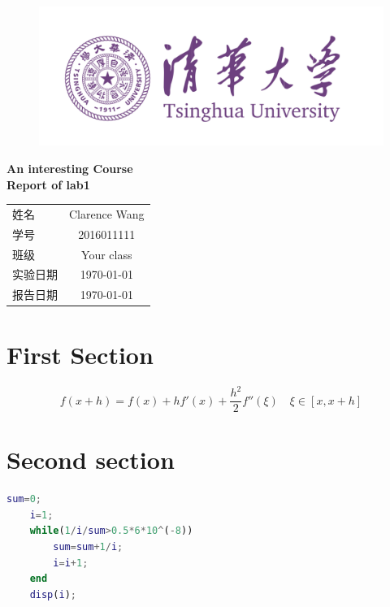 \documentclass[12pt, utf8, hyperref]{article}
\begin{document}
\begin{titlepage}

\begin{figure}[H]
	\centering
	\includegraphics[scale=0.5]{photos/logo.png}
\end{figure}

\phantom{Start!}
\vspace{1.7cm}
\begin{center}

{ \Huge \bfseries An interesting Course}\\[0.4cm]
{ \huge \bfseries Report of lab1}
\end{center}

\vfill

\begin{center}
{
\newcommand{\pillar}{ {\Huge \phantom{A}} }
\large
\begin{tabular}{lc}
\pillar 姓名 & Clarence Wang \\\cline{2-2}
\pillar 学号 & 2016011111 \\\cline{2-2}
\pillar 班级 & Your class \\\cline{2-2}
\pillar 实验日期 & \today \\\cline{2-2}
\pillar 报告日期 & \today \\\cline{2-2}
\end{tabular}
}
\end{center}
\end{titlepage}
 
\section{First Section}
\lipsum[5]
\[
    f(x+h) = f(x)+hf'(x)+\frac{{h}^{2}}{2}f''(\xi) \quad \xi \in [x, x+h]
\]

\section{Second section}
\lipsum[5]
\begin{lstlisting}[language=matlab]
    sum=0;
    i=1;
    while(1/i/sum>0.5*6*10^(-8))
        sum=sum+1/i;
        i=i+1; 
    end
    disp(i);
\end{lstlisting}
\end{document}
